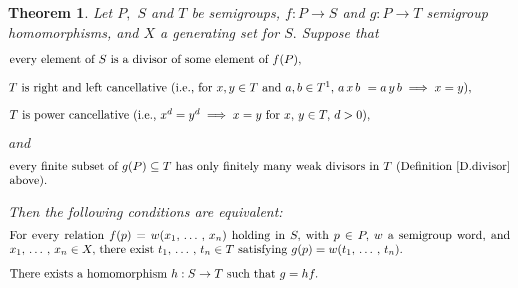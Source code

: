 \documentclass{amsart}
\newtheorem{theorem}{Theorem}
\numberwithin{equation}{section}
\numberwithin{theorem}{section}
\newcommand{\2}{\mathbf{2}}
\begin{document}
\begin{theorem}\label{T.main}
Let $P,$ $S$ and $T$ be semigroups, $f:P\to S$ and $g:P\to T$
semigroup homomorphisms, and $X$ a generating set for $S.$
Suppose that
%
\begin{equation}\begin{minipage}[c]{35pc}\label{d.oAdiv}
every element of $S$ is a divisor of some element of $f(P),$
\end{minipage}\end{equation}
%
\begin{equation}\begin{minipage}[c]{35pc}\label{d.cancel}
$T$ is right and left cancellative {\rm(}i.e., for $x,y\in T$
and $a,b\in T^1,$ $a\,x\,b\ = a\,y\,b \implies x = y),$
\end{minipage}\end{equation}
%
\begin{equation}\begin{minipage}[c]{35pc}\label{d.pwr}
$T$ is power cancellative
{\rm(}i.e., $x^d = y^d \implies x = y$ for $x,\,y\in T,$ $d>0),$
\end{minipage}\end{equation}
%
and
%
\begin{equation}\begin{minipage}[c]{35pc}\label{d.fin_wk_div}
every finite subset of $g(P) \subseteq T$ has
only finitely many weak divisors in $T$
{\rm(}Definition~\ref{D.divisor} above{\rm)}.
\end{minipage}\end{equation}

Then the following conditions are equivalent:
%
\begin{equation}\begin{minipage}[c]{35pc}\label{d.realization}
For every relation $f(p) = w(x_1,\,\dots\,,\,x_n)$ holding
in $S,$ with $p\in P,$ $w$ a semigroup word, and
$x_1,\,\dots\,,\,x_n\in X,$ there exist
$t_1,\,\dots\,,\,t_n\in T$ satisfying $g(p) = w(t_1,\,\dots\,,\,t_n).$
\end{minipage}\end{equation}
%
\begin{equation}\begin{minipage}[c]{35pc}\label{d.oEh}
There exists a homomorphism $h:S\to T$ such that $g=hf.$
\end{minipage}\end{equation}
%
\end{theorem}
\end{document}
